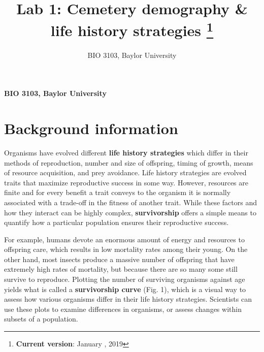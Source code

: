 \documentclass[11pt,]{article}
\title{Lab 1: Cemetery demography \& life history strategies \thanks{\textbf{Current version}: January , 2019}  }
\author{\Large BIO 3103, Baylor University\vspace{0.05in} \newline\normalsize\emph{}  }
\date{}
\newcommand*{\authorfont}{\fontfamily{phv}\selectfont}
\begin{document}
	
%



{%
\setlength{\parindent}{0pt}
\thispagestyle{plain}
{\fontsize{18}{20}\selectfont\raggedright 
\maketitle  %

}

{
   \vskip 13.5pt\relax \normalsize\fontsize{11}{12} 
\textbf{\authorfont BIO 3103, Baylor University} \hskip 15pt \emph{\small }   

}

}




\noindent  \section{Background information}\label{background-information}

Organisms have evolved different \textbf{life history strategies} which
differ in their methods of reproduction, number and size of offspring,
timing of growth, means of resource acquisition, and prey avoidance.
Life history strategies are evolved traits that maximize reproductive
success in some way. However, resources are finite and for every benefit
a trait conveys to the organism it is normally associated with a
trade-off in the fitness of another trait. While these factors and how
they interact can be highly complex, \textbf{survivorship} offers a
simple means to quantify how a particular population ensures their
reproductive success.

For example, humans devote an enormous amount of energy and resources to
offspring care, which results in low mortality rates among their young.
On the other hand, most insects produce a massive number of offspring
that have extremely high rates of mortality, but because there are so
many some still survive to reproduce. Plotting the number of surviving
organisms against age yields what is called a \textbf{survivorship
curve} (Fig. 1), which is a visual way to assess how various organisms
differ in their life history strategies. Scientists can use these plots
to examine differences in organisms, or assess changes within subsets of
a population.
\end{document}
